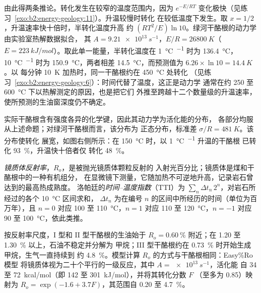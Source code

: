 由此得两条推论。转化发生在较窄的温度范围内，因为
$e^{-E/RT}$ 变化极快（见练习~\ref{exo:b2:energy-geology:11}）。升温较慢时转化
在较低温度下发生。取 $x = 1/2$，升温速率快十倍时，半转化温度升高
约 $(RT^2/E)\ln 10$。绿河干酪根的动力学由实验室热解数据拟合，
其 $A = \qty{9.21e13}{s^{-1}}$，$E/R = \qty{26800}{K}$（$E =
\qty{223}{kJ/mol}$）。取此单一能量，半转化温度在
\qty{1}{\celsius\per\Ma} 时为 \qty{136.4}{\celsius}，\qty{10}{\celsius\per\Ma} 时为 \qty{150.9}{\celsius}，两者相差
\qty{14.5}{\celsius}，而预测值为 $6.26 \times \ln 10 = \qty{14.4}{K}$。以
每分钟 \qty{10}{K} 加热时，同一干酪根约在 \qty{450}{\celsius} 处转化
（见练习~\ref{exo:b2:energy-geology:6}）：时间代替了温度，这正是动力学
通常在约 250 至 \qty{600}{\celsius} 下以热解测定的原因，也是把它们
外推至跨越十二个数量级的升温速率，使所预测的生油窗深度仍不确定。

实际干酪根含有强度各异的化学键，因此其动力学为活化能的分布，
各部分均服从上述命题；对绿河干酪根而言，该分布为
正态分布，标准差 $\sigma/R = \qty{481}{K}$。该分布使转化
展宽，如图右侧所示：在 \qty{150}{\celsius} 时，以 \qty{1}{\celsius\per\Ma} 升温的干酪根
已转化 \qty{93}{\percent}，升温快十倍者仅
转化 \qty{48}{\percent}。

\begin{definition}\label{def:b2:energy-geology:maturity}
\emph{镜质体反射率}，$R_o$，是被抛光镜质体颗粒反射的
入射光百分比；镜质体是煤和干酪根中的一种有机组分，
在显微镜下测量，它随加热不可逆地升高，记录岩石曾达到的最高热成熟度。
洛帕廷的\emph{时间–温度指数}（TTI）为
$\sum_n \Delta t_n\,2^n$，对岩石所经过的各个 \qty{10}{\celsius} 区间求和，
$\Delta t_n$ 为在编号 $n$ 的区间中所经历的时间（单位为百万年），且 $n = 0$
对应 100 至 \qty{110}{\celsius}，$n = 1$ 对应 110 至 \qty{120}{\celsius}，$n = -1$ 对应 90 至
\qty{100}{\celsius}，依此类推。
\end{definition}

按反射率尺度，I 型和 II 型干酪根的生油始于 $R_o =
\qty{0.60}{\percent}$ 附近；在 1.20 至 \qty{1.30}{\percent} 以上，石油不稳定并分解为
甲烷；III 型干酪根约在 \qty{0.73}{\percent} 时开始生成甲烷，生气一直持续到
约 \qty{4.8}{\percent}。模型计算 $R_o$ 的方式与干酪根相同：Easy\%Ro 模型
将镜质体视为二十个平行的一级反应，其中 $A = \qty{e13}{s^{-1}}$，活化能
自 34 至 \qty{72}{kcal/mol}（即 142 至 \qty{301}{kJ/mol}），并将其转化分数 $F$
（至多为 0.85）映射为 $R_o = \exp(-1.6 + 3.7F)$，其范围自 0.20 至 \qty{4.7}{\percent}。

